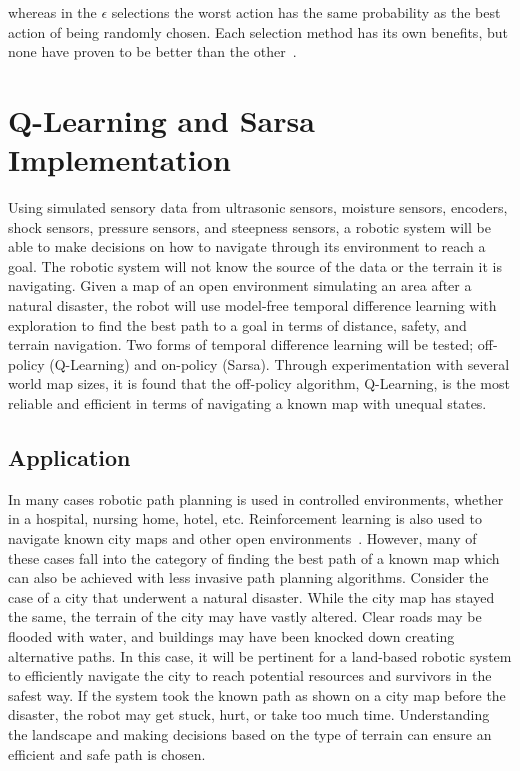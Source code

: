 \documentclass[12pt,american]{report}
\begin{document}
whereas in the \begin{math}\epsilon\end{math} selections the worst action has the same probability as the best action of being randomly chosen.  Each selection method has its own benefits, but none have proven to be better than the other~\cite{Eden}.


\section{Q-Learning and Sarsa Implementation}
Using simulated sensory data from ultrasonic sensors, moisture sensors, encoders, shock sensors, pressure sensors, and steepness sensors, a robotic system will be able to make decisions on how to navigate through its environment to reach a goal.  The robotic system will not know the source of the data or the terrain it is navigating.  Given a map of an open environment simulating an area after a natural disaster, the robot will use model-free temporal difference learning with exploration to find the best path to a goal in terms of distance, safety, and terrain navigation. Two forms of temporal difference learning will be tested; off-policy (Q-Learning) and on-policy (Sarsa). Through experimentation with several world map sizes, it is found that the off-policy algorithm, Q-Learning, is the most reliable and efficient in terms of navigating a known map with unequal states.

\subsection{Application}
In many cases robotic path planning is used in controlled environments, whether in a hospital, nursing home, hotel, etc. Reinforcement learning is also used to navigate known city maps and other open environments~\cite{peng2015mobile}. However, many of these cases fall into the category of finding the best path of a known map which can also be achieved with less invasive path planning algorithms. Consider the case of a city that underwent a natural disaster.  While the city map has stayed the same, the terrain of the city may have vastly altered. Clear roads may be flooded with water, and buildings may have been knocked down creating alternative paths. In this case, it will be pertinent for a land-based robotic system to efficiently navigate the city to reach potential resources and survivors in the safest way.  If the system took the known path as shown on a city map before the disaster, the robot may get stuck, hurt, or take too much time.  Understanding the landscape and making decisions based on the type of terrain can ensure an efficient and safe path is chosen.
\end{document}

